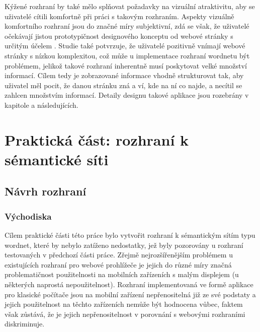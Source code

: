 \documentclass[a4paper, 11pt, oneside]{book}
\newcommand{\itNameRef}[1]{\textit{\nameref{#1}}}
\begin{document}
			Kýžené rozhraní by také mělo splňovat požadavky na vizuální atraktivitu, aby se uživatelé cítili komfortně při práci s takovým rozhraním. Aspekty vizuálně komfortního rozhraní jsou do značné míry subjektivní, zdá se však, že uživatelé očekávají jistou prototypičnost designového konceptu od webové stránky s určitým účelem \parencite{walker2013simple, tuch2012role}. Studie \parencite{tuch2012role} také potvrzuje, že uživatelé pozitivně vnímají webové stránky s nízkou komplexitou, což může u implementace rozhraní wordnetu být problémem, jelikož takové rozhraní inherentně musí poskytovat velké množství informací. Cílem tedy je zobrazované informace vhodně strukturovat tak, aby uživatel měl pocit, že danou stránku zná a ví, kde na ní co najde, a necítil se zahlcen množstvím informací. Detaily designu takové aplikace jsou rozebrány v kapitole \itNameRef{cha:navrh} a následujících.

	\part{Praktická část: rozhraní k sémantické síti}
	\label{part:drei}

		\chapter{Návrh rozhraní}
		\label{cha:navrh}


			\section{Východiska}

				Cílem praktické části této práce bylo vytvořit rozhraní k sémantickým sítím typu wordnet, které by nebylo zatíženo nedostatky, jež byly pozorovány u rozhraní testovaných v předchozí části práce. Zřejmě nejrozšířenějším problémem u existujících rozhraní pro webové prohlížeče je jejich do různé míry značná problematičnost použitelnosti na mobilních zařízeních s malým displejem (u některých naprostá nepoužitelnost). Rozhraní implementovaná ve formě aplikace pro klasické počítače jsou na mobilní zařízení nepřenositelná již ze své podstaty a jejich použitelnost na těchto zařízeních nemůže být hodnocena vůbec, faktem však zůstává, že je jejich nepřenositelnost v porovnání s webovými rozhraními diskriminuje. 
\end{document}
